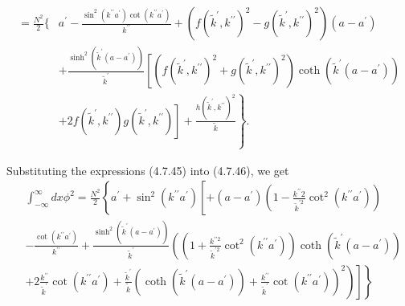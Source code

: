\documentclass{article}
\begin{document}
$$\begin{aligned}
=\frac{N^{2}}{2}\{ & a^{\prime}-\frac{\sin ^{2}\left(k^{\prime \prime} a^{\prime}\right) \cot \left(k^{\prime \prime} a^{\prime}\right)}{k^{\prime \prime}}+\left(f\left(\tilde{k}^{\prime}, k^{\prime \prime}\right)^{2}-g\left(\tilde{k}^{\prime}, k^{\prime \prime}\right)^{2}\right)\left(a-a^{\prime}\right) \\
& +\frac{\sinh ^{2}\left(\tilde{k}^{\prime}\left(a-a^{\prime}\right)\right)}{\tilde{k}^{\prime}}\left[\left(f\left(\tilde{k}^{\prime}, k^{\prime \prime}\right)^{2}+g\left(\tilde{k}^{\prime}, k^{\prime \prime}\right)^{2}\right) \operatorname{coth}\left(\tilde{k}^{\prime}\left(a-a^{\prime}\right)\right)\right. \\
& \left.\left.+2 f\left(\tilde{k}^{\prime}, k^{\prime \prime}\right) g\left(\tilde{k}^{\prime}, k^{\prime \prime}\right)\right]+\frac{h\left(\tilde{k}^{\prime}, k^{\prime \prime}\right)^{2}}{\tilde{k}}\right\} .
\end{aligned}
$$

Substituting the expressions (4.7.45) into (4.7.46), we get
$$
\begin{align*}
& \int_{-\infty}^{\infty} d x \phi^{2}=\frac{N^{2}}{2}\left\{a^{\prime}+\sin ^{2}\left(k^{\prime \prime} a^{\prime}\right)\left[+\left(a-a^{\prime}\right)\left(1-\frac{k^{\prime \prime} 2}{\tilde{k}^{\prime 2}} \cot ^{2}\left(k^{\prime \prime} a^{\prime}\right)\right)\right.\right.  \tag{4.7.47}\\
&-\frac{\cot \left(k^{\prime \prime} a^{\prime}\right)}{k^{\prime \prime}}+\frac{\sinh ^{2}\left(\tilde{k}^{\prime}\left(a-a^{\prime}\right)\right)}{\tilde{k}^{\prime}}\left(\left(1+\frac{k^{\prime \prime 2}}{\tilde{k}^{\prime 2}} \cot ^{2}\left(k^{\prime \prime} a^{\prime}\right)\right) \operatorname{coth}\left(\tilde{k}^{\prime}\left(a-a^{\prime}\right)\right)\right. \\
&\left.\left.\left.+2 \frac{k^{\prime \prime}}{\tilde{k}^{\prime}} \cot \left(k^{\prime \prime} a^{\prime}\right)+\frac{\tilde{k}^{\prime}}{\tilde{k}}\left(\operatorname{coth}\left(\tilde{k}^{\prime}\left(a-a^{\prime}\right)\right)+\frac{k^{\prime \prime}}{\tilde{k}^{\prime}} \cot \left(k^{\prime \prime} a^{\prime}\right)\right)^{2}\right)\right]\right\}
\end{align*}
$$
\end{document}

